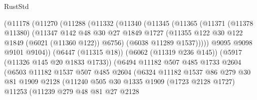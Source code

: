 \begin{lexlean}{RustStd}
\begin{coremodule}
                        (@11178
                          (@11270
                            (@11288
                              (@11332
                                (@11340
                                  (@11345
                                    (@11365
                                      (@11371
                                        (@11378 @11380)
                                        (@11347
                                          @142
                                          @48
                                          @30
                                          @27
                                          @1849
                                          @1727
                                          (@11355 @122 @30 @122 @1849 (@6021 (@11360 @122)) @6756)
                                          (@6038 @11289 @1537)))))
                                  @9095
                                  @9098
                                  @9101
                                  @9104))
                              (@6447 (@11315 @18))
                              (@6062 (@11319 @236 @145))
                              (@5917 (@11326 @145 @20 @1833 @1733))
                              (@6494
                                @11182
                                @507
                                @485
                                @1733
                                @2604
                                (@6503
                                  @11182
                                  @1537
                                  @507
                                  @485
                                  @2604
                                  (@6324
                                    @11182
                                    @1537
                                    @86
                                    @279
                                    @30
                                    @81
                                    @1909
                                    @2128
                                    (@11240
                                      @505
                                      @30
                                      @1335
                                      @1909
                                      (@1723 @2128 @1727)
                                      @11253
                                      (@11239
                                        @279
                                        @48
                                        @81
                                        @27
                                        @2128

\end{coremodule}
\end{lexlean}
